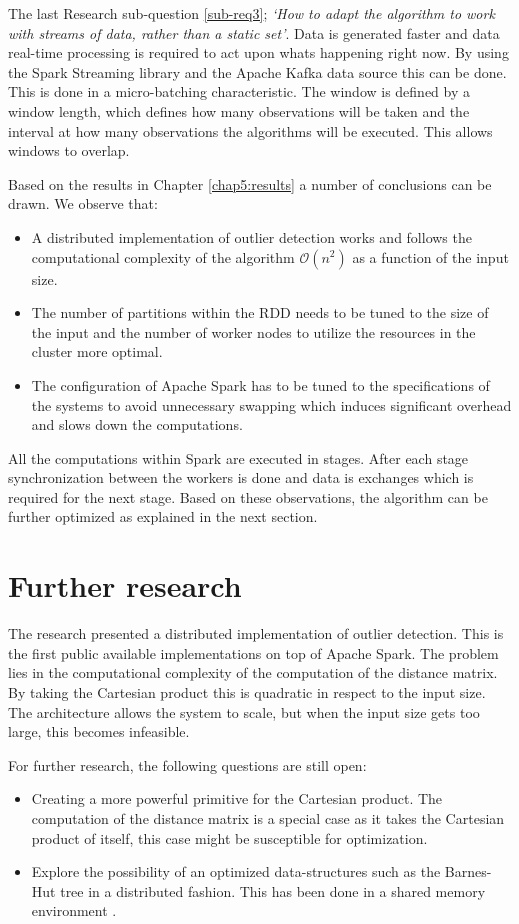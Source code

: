 The last Research sub-question \ref{sub-req3}; \emph{`How to adapt the algorithm to work with streams of data, rather than a static set'}. Data is generated faster and data real-time processing is required to act upon whats happening right now. By using the Spark Streaming library and the Apache Kafka data source this can be done. This is done in a micro-batching characteristic. The window is defined by a window length, which defines how many observations will be taken and the interval at how many observations the algorithms will be executed. This allows windows to overlap.

Based on the results in Chapter \ref{chap5:results} a number of conclusions can be drawn. We observe that:

\begin{itemize} 
    \item A distributed implementation of outlier detection works and follows the computational complexity of the algorithm $\mathcal{O}(n^{2})$ as a function of the input size.
    \item The number of partitions within the RDD needs to be tuned to the size of the input and the number of worker nodes to utilize the resources in the cluster more optimal.
    \item The configuration of Apache Spark has to be tuned to the specifications of the systems to avoid unnecessary swapping which induces significant overhead and slows down the computations.
\end{itemize}

All the computations within Spark are executed in stages. After each stage synchronization between the workers is done and data is exchanges which is required for the next stage. Based on these observations, the algorithm can be further optimized as explained in the next section.

\section{Further research \label{sec:futherResearch}}
The research presented a distributed implementation of outlier detection. This is the first public available implementations on top of Apache Spark. The problem lies in the computational complexity of the computation of the distance matrix. By taking the Cartesian product this is quadratic in respect to the input size. The architecture allows the system to scale, but when the input size gets too large, this becomes infeasible.

For further research, the following questions are still open:
\begin{itemize}
    \item Creating a more powerful primitive for the Cartesian product. The computation of the distance matrix is a special case as it takes the Cartesian product of itself, this case might be susceptible for optimization.
    \item Explore the possibility of an optimized data-structures such as the Barnes-Hut tree \cite{Barnes1986} in a distributed fashion. This has been done in a shared memory environment \cite{Dubinski1996132}.
\end{itemize}

